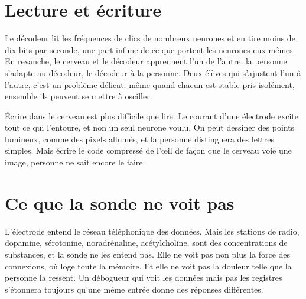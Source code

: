 \section*{Lecture et écriture}

Le décodeur lit les fréquences de clics de nombreux neurones et en tire moins de dix bits par seconde, une part infime de ce que portent les neurones eux-mêmes. En revanche, le cerveau et le décodeur apprennent l'un de l'autre: la personne s'adapte au décodeur, le décodeur à la personne. Deux élèves qui s'ajustent l'un à l'autre, c'est un problème délicat: même quand chacun est stable pris isolément, ensemble ils peuvent se mettre à osciller.

Écrire dans le cerveau est plus difficile que lire. Le courant d'une électrode excite tout ce qui l'entoure, et non un seul neurone voulu. On peut \og dessiner\fg{} des points lumineux, comme des pixels allumés, et la personne distinguera des lettres simples. Mais écrire le code compressé de l'œil de façon que le cerveau voie une image, personne ne sait encore le faire.

\section*{Ce que la sonde ne voit pas}

L'électrode entend le réseau téléphonique des données. Mais les stations de radio, dopamine, sérotonine, noradrénaline, acétylcholine, sont des concentrations de substances, et la sonde ne les entend pas. Elle ne voit pas non plus la force des connexions, où loge toute la mémoire. Et elle ne voit pas la douleur telle que la personne la ressent. Un débogueur qui voit les données mais pas les registres s'étonnera toujours qu'une même entrée donne des réponses différentes.

